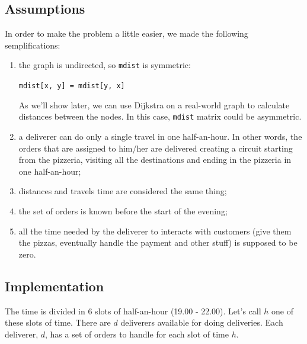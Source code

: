 \documentclass[10pt]{article}
\begin{document}
	\subsection{Assumptions}
	\label{subsec-assumptions}
	In order to make the problem a little easier, we made the following 
	semplifications:
	\begin{enumerate}
		\item the graph is undirected, so \texttt{mdist} is symmetric:
		\begin{center}
			\texttt{mdist[x, y] = mdist[y, x]}
		\end{center} 
		As we'll show later, we can use Dijkstra on a real-world graph to calculate 
		distances between the nodes. In this case, \texttt{mdist} matrix could be
		asymmetric. 

		\item a deliverer can do only a single travel in one half-an-hour. In other
			words, the orders that are assigned to him/her are delivered creating 
			a circuit starting from the pizzeria, visiting all the destinations 
			and ending in the pizzeria in one half-an-hour;
		\item distances and travels time are considered the same thing;
		\item the set of orders is known before the start of the evening;
		\item all the time needed by the deliverer to interacts with customers (give them the pizzas,
			eventually handle the payment and other stuff) is supposed to be zero. %
	\end{enumerate}

	\subsection{Implementation}


	
	The time is divided in 6 slots of half-an-hour (19.00 - 22.00). Let's call
	$h$ one of these slots of time.
	There are $d$ deliverers available for doing deliveries.
	Each deliverer, $d$, has a set of orders to handle for each slot of time $h$.
\end{document}

